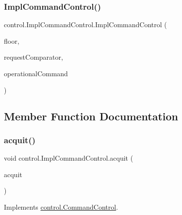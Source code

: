 \mbox{\label{classcontrol_1_1_impl_command_control_a384f52aa39c3a5745b9143d6763e36a9}} 
\subsubsection{\texorpdfstring{ImplCommandControl()}{ImplCommandControl()}\hspace{0.1cm}{\footnotesize\ttfamily [3/3]}}
{\footnotesize\ttfamily control.\+Impl\+Command\+Control.\+Impl\+Command\+Control (\begin{DoxyParamCaption}\item[{int}]{floor,  }\item[{Comparator$<$ \mbox{\hyperlink{classcontrol_1_1command_1_1_floor_request}{Floor\+Request}} $>$}]{request\+Comparator,  }\item[{\mbox{\hyperlink{interfacecontrol_1_1_operational_command}{Operational\+Command}}}]{operational\+Command }\end{DoxyParamCaption})}



\subsection{Member Function Documentation}
\mbox{\label{classcontrol_1_1_impl_command_control_a18ba4e8d7e7b6ebfec099c22f58d55d1}} 
\subsubsection{\texorpdfstring{acquit()}{acquit()}}
{\footnotesize\ttfamily void control.\+Impl\+Command\+Control.\+acquit (\begin{DoxyParamCaption}\item[{\mbox{\hyperlink{classcontrol_1_1command_1_1_acquit}{Acquit}}}]{acquit }\end{DoxyParamCaption})}



Implements \mbox{\hyperlink{interfacecontrol_1_1_command_control_a7eb9b7d638a4680fdf89453ca16a6c93}{control.\+Command\+Control}}.

